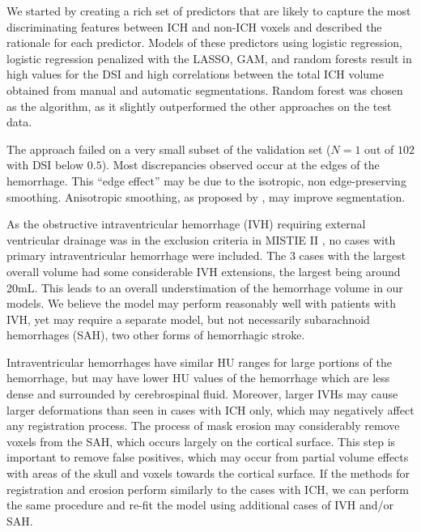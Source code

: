 \documentclass{elsarticle_nonatbib}\usepackage[]{graphicx}\usepackage[]{color}
\begin{document}
We started by creating a rich set of predictors that are likely to capture the most discriminating features between ICH and non-ICH voxels and described the rationale for each predictor.  Models of these predictors using logistic regression, logistic regression penalized with the LASSO, GAM, and random forests result in high values for the DSI and high correlations between the total ICH volume obtained from manual and automatic segmentations.  Random forest was chosen as the algorithm, as it slightly outperformed the other approaches on the test data.


The approach failed on a very small subset of the validation set ($N = 1$ out of $102$ with DSI below $0.5$). Most discrepancies observed occur at the edges of the hemorrhage.  This ``edge effect'' may be due to the isotropic, non edge-preserving smoothing.  Anisotropic smoothing, as proposed by \citet{perona1994anisotropic}, may improve segmentation.

As the obstructive intraventricular hemorrhage (IVH) requiring external ventricular drainage was in the exclusion criteria in MISTIE II \citep{mould_minimally_2013}, no cases with primary intraventricular hemorrhage were included.  The 3 cases with the largest overall volume had some considerable IVH extensions, the largest being around 20mL.  This leads to an overall understimation of the hemorrhage volume in our models.  We believe the model may perform reasonably well with patients with IVH, yet may require a separate model, but not necessarily subarachnoid hemorrhages (SAH), two other forms of hemorrhagic stroke.  

Intraventricular hemorrhages have similar HU ranges for large portions of the hemorrhage, but may have lower HU values of the hemorrhage which are less dense and surrounded by cerebrospinal fluid.  Moreover, larger IVHs may cause larger deformations than seen in cases with ICH only, which may negatively affect any registration process. The process of mask erosion may considerably remove voxels from the SAH, which occurs largely on the cortical surface.  This step is important to remove false positives, which may occur from partial volume effects with areas of the skull and voxels towards the cortical surface. If the methods for registration and erosion perform similarly to the cases with ICH, we can perform the same procedure and re-fit the model using additional cases of IVH and/or SAH.
\end{document}
